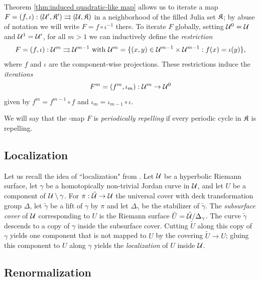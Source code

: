 \documentclass[12pt]{amsart}
\begin{document}
Theorem \ref{thm:induced quadratic-like map} allows us to iterate a \pql map $F= (f, \iota): (\mathcal U', \mathfrak{K}')\rightrightarrows (\mathcal U, \mathfrak{K})$ in a neighborhood of the filled Julia set $\mathfrak{K}$; by abuse of notation we will write $F = f\circ \iota^{-1}$ there.
To iterate $F$ globally, setting $\mathcal U^0 = \mathcal U$ and $\mathcal U^1 = \mathcal U'$, for all $m>1$ we can inductively define the \textit{restriction} 
$$F= (f, \iota): \mathcal U^m\rightrightarrows\mathcal U^{m-1} \text{ with } \mathcal U^m = \{(x, y)\in \mathcal U^{m-1}\times \mathcal U^{m-1}: f(x) = \iota(y)\},$$
where $f$ and $\iota$ are the component-wise projections. These restrictions induce the \textit{iterations}  $$F^m = (f^m, \iota_m): \mathcal U^m\to \mathcal U^0$$
given by $f^m =  f^{m-1}\circ f$ and $\iota_m = \iota_{m-1} \circ \iota$. 

We will say that the \pql-map $F$ is \emph{periodically repelling}  if every periodic cycle in $\mathfrak{K}$ is repelling.

\subsection{Localization}\label{sec:localization}

Let us recall the idea of ``localization" from \cite[Section 7.4.1]{K06}. 
Let $\mathcal U$ be a hyperbolic Riemann surface, let $\gamma$ be a homotopically non-trivial Jordan curve in $\mathcal U$, and let $U$ be a component of $\mathcal U\setminus \gamma$. For $\pi: \tilde {\mathcal U}\to \mathcal U$ the universal cover with deck transformation group $\Delta$, let 
$\tilde \gamma$ be a lift of $\gamma$ by $\pi$ and let 
 $\Delta_\gamma$ be the stabilizer of $\tilde \gamma$.
 The \emph{subsurface cover} of $\mathcal U$ corresponding to $U$ is the Riemann surface $\tilde U= \tilde {\mathcal U}/ \Delta_\gamma$. 
 The curve $\tilde \gamma$ descends to a copy of $\gamma$ inside the subsurface cover.
 Cutting $\tilde U$ along this copy of $\gamma$ yields one component that is not mapped to $U$ by the covering $\tilde U\to U$; gluing this component to $U$ along $\gamma$ yields the \emph{localization}  of $U$ inside $\mathcal U$.


\subsection{Renormalization}\label{sec:renorm}
\end{document}
